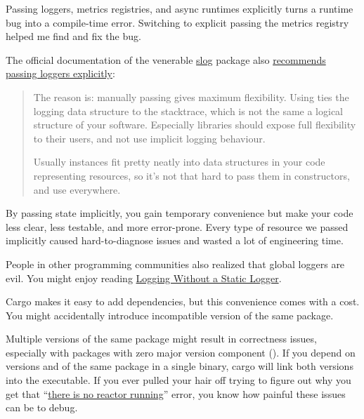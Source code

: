 \documentclass{article}
\begin{document}
Passing loggers, metrics registries, and async runtimes explicitly turns a runtime bug into a compile-time error.
Switching to explicit passing the metrics registry helped me find and fix the bug.

The official documentation of the venerable \href{https://crates.io/crates/slog}{slog} package also \href{https://github.com/slog-rs/slog/wiki/FAQ#do-i-have-to-pass-logger-around}{recommends passing loggers explicitly}:

\blockquote{
  The reason is: manually passing  gives maximum flexibility.
  Using  ties the logging data structure to the stacktrace, which is not the same a logical structure of your software.
  Especially libraries should expose full flexibility to their users, and not use implicit logging behaviour.

  Usually  instances fit pretty neatly into data structures in your code representing resources, so it's not that hard to pass them in constructors, and use  everywhere. 
}{\href{https://github.com/slog-rs/slog/wiki/FAQ#do-i-have-to-pass-logger-around}{ }}

By passing state implicitly, you gain temporary convenience but make your code less clear, less testable, and more error-prone.
Every type of resource we passed implicitly caused hard-to-diagnose issues and wasted a lot of engineering time.

People in other programming communities also realized that global loggers are evil.
You might enjoy reading \href{https://www.yegor256.com/2019/03/19/logging-without-static-logger.html}{Logging Without a Static Logger}.


Cargo makes it easy to add dependencies, but this convenience comes with a cost.
You might accidentally introduce incompatible version of the same package.

Multiple versions of the same package might result in correctness issues, especially with packages with zero major version component ().
If you depend on versions  and  of the same package in a single binary, cargo will link both versions into the executable.
If you ever pulled your hair off trying to figure out why you get that ``\href{https://github.com/awslabs/aws-lambda-rust-runtime/issues/266}{there is no reactor running}'' error, you know how painful these issues can be to debug.
\end{document}
